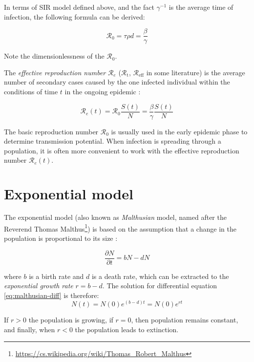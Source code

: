 \documentclass[
  digital, %
  oneside, %
  lof,     %
  lot,     %
]{fithesis4}
\begin{document}
In terms of SIR model defined above, and the fact $\gamma^{-1}$ is 
the average time of infection, the following formula can be derived:

\begin{equation}
	\mathcal{R}_0 = \tau \rho d = \frac{\beta}{\gamma}
\end{equation}

Note the dimensionlessness of the $\mathcal{R}_0$.

The \textit{effective reproduction number} $\mathcal{R}_e$ 
($\mathcal{R}_{\text{t}}$, $\mathcal{R}_{\text{eff}}$ in 
some literature) is the average number of secondary cases 
caused by the one infected individual within the 
conditions of time $t$ in the ongoing epidemic \cite{chowell2016}:

\begin{equation}
	\mathcal{R}_e(t) = \mathcal{R}_0 \frac{S(t)}{N} = \frac{\beta}{\gamma} \frac{S(t)}{N}
\end{equation}

The basic reproduction number $\mathcal{R}_0$ is usually used
in the early epidemic phase to determine transmission potential.
When infection is
spreading through a population, it is often more convenient
to work with the effective reproduction number $\mathcal{R}_e(t)$.


\section{Exponential model}

The exponential model (also known as \textit{Malthusian} model, named after the 
Reverend Thomas Malthus\footnote{\url{https://cs.wikipedia.org/wiki/Thomas_Robert_Malthus}})
is based on the assumption that a change in the population 
is proportional to its size \cite{martcheva2015}:

\begin{equation}\label{eq:malthusian-diff}
  \frac{\partial N}{\partial t} = b N - d N
\end{equation}

where $b$ is a birth rate and $d$ is a death rate, which 
can be extracted to the \textit{exponential growth rate} $r = b - d$.
The solution for differential equation \eqref{eq:malthusian-diff} is therefore:
\begin{equation}
  N(t) = N(0) e^{(b - d)t} = N(0) e^{rt}
\end{equation}

If $r > 0$ the population is growing,
if $r = 0$, then population remains constant, and finally, 
when $r < 0$ the population leads to extinction.
\end{document}
